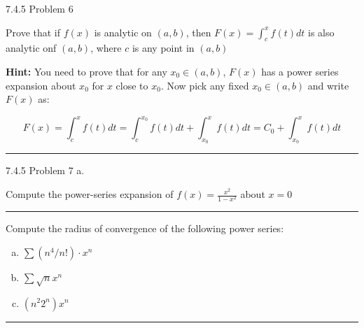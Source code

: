 \documentclass[11pt]{article}
\begin{document}
 7.4.5 Problem 6

Prove that if $f(x)$ is analytic on $(a,b)$, then $F(x) = \int_c ^x f(t)dt$ 
is also analytic onf $(a,b)$, where $c$ is any point in $(a,b)$

\textbf{Hint:} You need to prove that for any $x_0 \in (a,b)$, $F(x)$ has
a power series expansion about $x_0$ for $x$ close to $x_0$.
Now pick any fixed $x_0 \in (a,b)$ and write $F(x)$ as:

$$F(x) = \int_c ^x f(t) dt = \int_c ^{x_0} f(t) dt + \int_{x_0} ^x f(t) dt = C_0 + \int_{x_0} ^x f(t)dt$$

\hrule








 7.4.5 Problem 7 a.

Compute the power-series expansion of $f(x) = \frac{x^2}{1-x^2}$ about $x=0$

\hrule








Compute the radius of convergence of the following power series:

\begin{enumerate}[a.]
    \item $\sum (n^4/n!) \cdot x^n$
    \item $\sum \sqrt{n} x^n$
    \item $(n^2 2^n) x^n$
\end{enumerate}

\hrule
\end{document}
